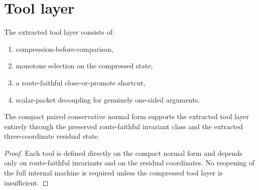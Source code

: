 \section{Tool layer}
\begin{definition}\label{def:tool-layer}
The extracted tool layer consists of:
\begin{enumerate}[leftmargin=2em]
  \item compression-before-comparison,
  \item monotone selection on the compressed state,
  \item a route-faithful close-or-promote shortcut,
  \item scalar-packet decoupling for genuinely one-sided arguments.
\end{enumerate}
\end{definition}

\begin{theorem}\label{thm:tool-extraction}
The compact paired conservative normal form supports the extracted tool layer entirely through the preserved route-faithful invariant class and the extracted three-coordinate residual state.
\end{theorem}

\begin{proof}
Each tool is defined directly on the compact normal form and depends only on route-faithful invariants and on the residual coordinates. No reopening of the full internal machine is required unless the compressed tool layer is insufficient.
\end{proof}

